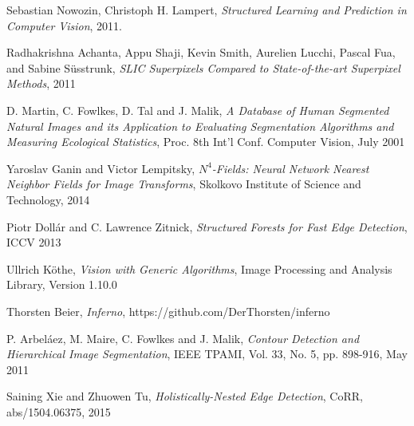 
\manualmark
\markboth{\spacedlowsmallcaps{\bibname}}{\spacedlowsmallcaps{\bibname}} %
{}
\label{app:bibliography}




\begin{thebibliography}{9}

  Sebastian Nowozin, Christoph H. Lampert,
  \emph{Structured Learning and Prediction in Computer Vision},
  2011.
  
  Radhakrishna Achanta, Appu Shaji, Kevin Smith, Aurelien Lucchi, Pascal Fua, and Sabine Süsstrunk, 
  \emph{SLIC Superpixels Compared to State-of-the-art Superpixel Methods},
  2011
  
	D. Martin, C. Fowlkes, D. Tal and J. Malik,
	\emph{A Database of Human Segmented Natural Images and its
	           Application to Evaluating Segmentation Algorithms and
	           Measuring Ecological Statistics},
	Proc. 8th Int'l Conf. Computer Vision,
	July 2001		
	
	Yaroslav Ganin and Victor Lempitsky,
	\emph{$N^4$-Fields: Neural Network Nearest Neighbor Fields for Image Transforms},
	Skolkovo Institute of Science and Technology,
	2014
	
  Piotr Dollár and C. Lawrence Zitnick,
  \emph{Structured Forests for Fast Edge Detection},
  ICCV 2013
  
 	Ullrich Köthe,
 	\emph{Vision with Generic Algorithms},
 	Image Processing and Analysis Library,
 	Version 1.10.0
 	
 	Thorsten Beier, 
 	\emph{Inferno}, 
 	https://github.com/DerThorsten/inferno
 	
 	P. Arbeláez, M. Maire, C. Fowlkes and J. Malik, 
 	\emph{Contour Detection and Hierarchical Image Segmentation},
 	IEEE TPAMI, Vol. 33, No. 5, pp. 898-916, May 2011
 	
 	Saining Xie and Zhuowen Tu,
 	\emph{Holistically-Nested Edge Detection},
 	CoRR, abs/1504.06375, 2015
 

\end{thebibliography}
